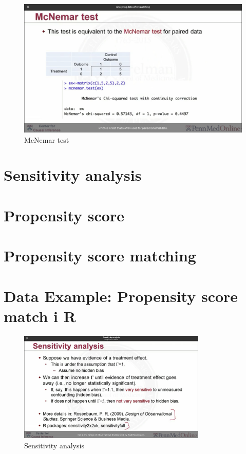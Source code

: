 \begin{figure}[htbp]
	\setlength{\abovecaptionskip}{0pt}     %
	\setlength{\belowcaptionskip}{10pt}
	\vspace{-0cm}  %
	\setlength{\abovecaptionskip}{-0cm}   %
	\setlength{\belowcaptionskip}{-0cm}   %
	\centering
	\includegraphics[width=0.8 \textwidth]{figure/mcnemar.jpg}
	\caption{McNemar test}
	\label{mcnemar}
\end{figure}

\section{Sensitivity analysis}
\section{Propensity score}
\section{Propensity score matching}
\section{Data Example: Propensity score match i R}


\begin{figure}[htbp]
	\setlength{\abovecaptionskip}{0pt}     %
	\setlength{\belowcaptionskip}{10pt}
	\vspace{-0cm}  %
	\setlength{\abovecaptionskip}{-0cm}   %
	\setlength{\belowcaptionskip}{-0cm}   %
	\centering
	\includegraphics[width=0.8\textwidth]{figure/sensitivity.jpg}
	\caption{Sensitivity analysis}
	\label{sen}
\end{figure}

